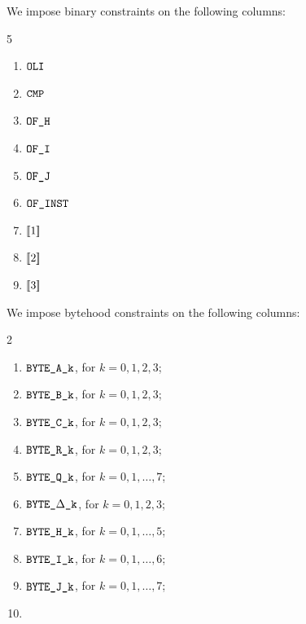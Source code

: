 We impose binary constraints on the following columns:
\begin{multicols}{5}
\begin{enumerate}
	\item $\texttt{OLI}$
	\item $\texttt{CMP}$
	\item $\texttt{OF\_H}$
	\item $\texttt{OF\_I}$
	\item $\texttt{OF\_J}$
	\item $\texttt{OF\_INST}$
	\item $[\![1]\!]$
	\item $[\![2]\!]$
	\item $[\![3]\!]$
\end{enumerate}
\end{multicols}
\noindent  We impose bytehood constraints on the following columns: %
\begin{multicols}{2}
\begin{enumerate}
	\item $\texttt{BYTE}\texttt{\_A\_k}$, for $k=0,1,2,3$;
	\item $\texttt{BYTE}\texttt{\_B\_k}$, for $k=0,1,2,3$;
	\item $\texttt{BYTE}\texttt{\_C\_k}$, for $k=0,1,2,3$;
	\item $\texttt{BYTE}\texttt{\_R\_k}$, for $k=0,1,2,3$;
	\item $\texttt{BYTE}\texttt{\_Q\_k}$, for $k=0,1,\dots,7$;
	\item $\texttt{BYTE}\texttt{\_$\Delta$\_k}$, for $k=0,1,2,3$;
	\item $\texttt{BYTE}\texttt{\_H\_k}$, for $k=0,1,\dots,5$;
	\item $\texttt{BYTE}\texttt{\_I\_k}$, for $k=0,1,\dots,6$;
	\item $\texttt{BYTE}\texttt{\_J\_k}$, for $k=0,1,\dots,7$;
	\item[\vspace{\fill}]
\end{enumerate}
\end{multicols}
